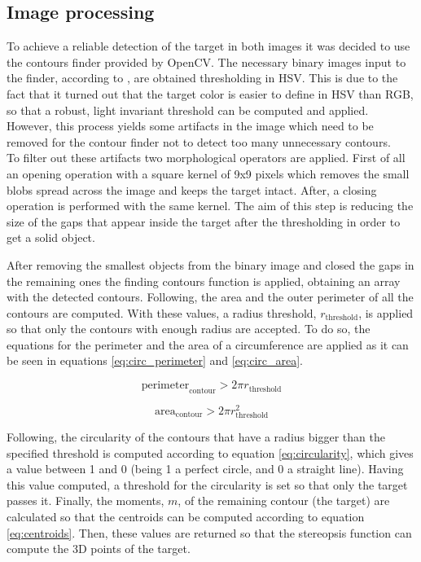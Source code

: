 \subsection{Image processing}
To achieve a reliable detection of the target in both images it was decided to use the contours finder provided by OpenCV.
The necessary binary images input to the finder, according to \cite{suzuki}, are obtained thresholding in HSV.
This is due to the fact that it turned out that the target color is easier to define in HSV than RGB, so that a robust, light invariant threshold can be computed and applied.
However, this process yields some artifacts in the image which need to be removed for the contour finder not to detect too many unnecessary contours. \\

To filter out these artifacts two morphological operators are applied. First of all an opening operation with a square kernel of 9x9 pixels which removes the small blobs spread across the image and keeps the target intact. After, a closing operation is performed with the same kernel. The aim of this step is reducing the size of the gaps that appear inside the target after the thresholding in order to get a solid object.

After removing the smallest objects from the binary image and closed the gaps in the remaining ones the finding contours function is applied, obtaining an array with the detected contours. Following, the area and the outer perimeter of all the contours are computed. With these values, a radius threshold, $r_\mathrm{threshold}$, is applied so that only the contours with enough radius are accepted. To do so, the equations for the perimeter and the area of a circumference are applied as it can be seen in equations \ref{eq:circ_perimeter} and \ref{eq:circ_area}.

\begin{equation}
\mathrm{perimeter}_\mathrm{contour} > 2 \pi r_\mathrm{threshold}
\label{eq:circ_perimeter}
\end{equation}

\begin{equation}
\mathrm{area}_\mathrm{contour} > 2 \pi r_\mathrm{threshold}^{2}
\label{eq:circ_area}
\end{equation}

Following, the circularity of the contours that have a radius bigger than the specified threshold is computed according to equation \ref{eq:circularity}, which gives a value between 1 and 0 (being 1 a perfect circle, and 0 a straight line). Having this value computed, a threshold for the circularity is set so that only the target passes it. Finally, the moments, $m$, of the remaining contour (the target) are calculated so that the centroids can be computed according to equation \ref{eq:centroids}. Then, these values are returned so that the stereopsis function can compute the 3D points of the target.

